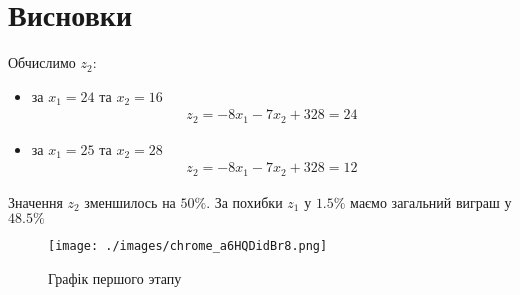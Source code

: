 \section{Висновки}
\label{sec:summary}

Обчислимо $z_2$:
\begin{itemize}
      \item за $x_1 = 24$ та $x_2 = 16$
            \begin{align}
                  z_2 = -8x_1 - 7x_2 + 328 = 24
            \end{align}
      \item за $x_1 = 25$ та $x_2 = 28$
            \begin{align}
                  z_2 = -8x_1 - 7x_2 + 328 = 12
            \end{align}
\end{itemize}
Значення $z_2$ зменшилось на $50\%$.
За похибки $z_1$ у $1.5\%$ маємо загальний виграш у $48.5\%$

\begin{figure}[!ht]
      \centering
      \texttt{[image: ./images/chrome\_a6HQDidBr8.png]}
      \caption{Графік першого этапу}
      \label{fig:graph6}
\end{figure}
